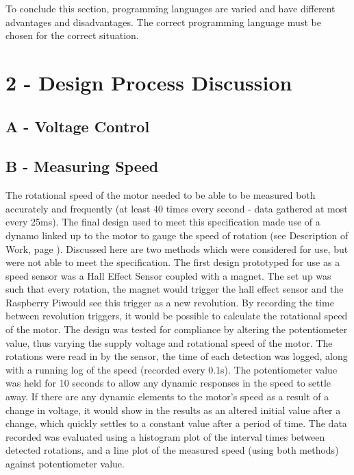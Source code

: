 \documentclass[twoside,a4]{report}
\def\br{\newline \newline \noindent}
\def\rpi{Raspberry Pi}
\begin{document}
	To conclude this section,  programming languages are varied and have different advantages and disadvantages. The correct programming language must be chosen for the correct situation.\newline \newline  \noindent

\section{2 - Design Process Discussion}
\subsection{A - Voltage Control}
\subsection{B - Measuring Speed}
The rotational speed of the motor needed to be able to be measured both accurately and frequently (at least 40 times every second - data gathered at most every 25ms). The final design used to meet this specification made use of a dynamo linked up to the motor to gauge the speed of rotation (see Description of Work, page \pageref{chap:dow}). Discussed here are two methods which were considered for use, but were not able to meet the specification.\br 
The first design prototyped for use as a speed sensor was a Hall Effect Sensor coupled with a magnet. The set up was such that every rotation, the magnet would trigger the hall effect sensor and the \rpi would see this trigger as a new revolution. By recording the time between revolution triggers, it would be possible to calculate the rotational speed of the motor. The design was tested for compliance by altering the potentiometer value, thus varying the supply voltage and rotational speed of the motor. The rotations were read in by the sensor, the time of each detection was logged, along with a running log of the speed (recorded every 0.1s). The potentiometer value was held for 10 seconds to allow any dynamic responses in the speed to settle away. If there are any dynamic elements to the motor's speed as a result of a change in voltage, it would show in the results as an altered initial value after a change, which quickly settles to a constant value after  a period of time. The data recorded was evaluated using a histogram plot of the interval times between detected rotations, and a line plot of the measured speed (using both methods) against potentiometer value. \newline \newline \noindent
\end{document}
